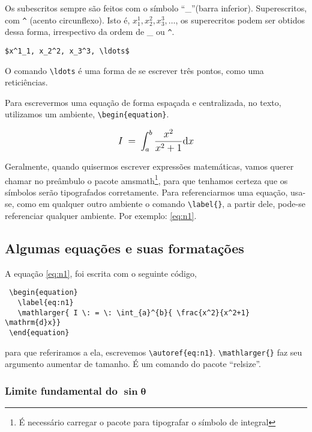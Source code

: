 \documentclass[12pt,
brazilian,
a5paper]{abntex2} %
\begin{document}
Os subescritos sempre são feitos com o símbolo ``\_''(barra inferior). Superescritos,
com \verb+^+ (acento circunflexo). Isto é, $x^1_1, x_2^2, x_3^3,
\ldots$, os superecritos podem ser obtidos dessa forma, irrespectivo
da ordem de \_ ou \verb_^_.

\begin{verbatim}
$x^1_1, x_2^2, x_3^3, \ldots$
\end{verbatim}
\noident O comando  \verb+\ldots+ é uma forma de se escrever três pontos,
como uma reticiências.

Para escrevermos uma equação de forma espaçada e centralizada, no
texto, utilizamos um ambiente, \verb+\begin{equation}+.

  \begin{equation}
    \label{eq:n1}
    \mathlarger{ I \: = \: \int_{a}^{b}{\frac{x^2}{x^2+1}\mathrm{d}x }}
  \end{equation}

  Geralmente, quando quisermos escrever expressões matemáticas, vamos
  querer chamar no preâmbulo o pacote amsmath\footnote{É necessário carregar o pacote
     para tipografar o símbolo de integral}, para que
  tenhamos certeza que os símbolos serão tipografados corretamente.
  Para referenciarmos uma equação, usa-se, como em qualquer outro
  ambiente o comando \verb+\label{}+, a partir dele, pode-se
  referenciar qualquer ambiente. Por exemplo: \autoref{eq:n1}.

  \clearpage

  \subsection{Algumas equações e suas formatações}

  A equação \autoref{eq:n1}, foi escrita com o seguinte código,

\begin{verbatim}
 \begin{equation}
   \label{eq:n1}
   \mathlarger{ I \: = \: \int_{a}^{b}{ \frac{x^2}{x^2+1} \mathrm{d}x}}
 \end{equation}
\end{verbatim}

  para que referiramos a ela, escrevemos
  \verb+\autoref{eq:n1}+. \verb+\mathlarger{}+ faz seu argumento
  aumentar de tamanho. É um comando do pacote ``relsize''.

  \subsubsection{Limite fundamental do $\mathbf{\sin{\theta}}$}
\end{document}
